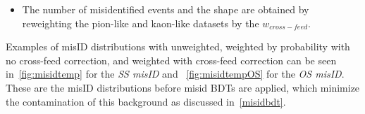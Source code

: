 \begin {itemize}
\begin{itemize}
\item For each event in both kaon-like and pion-like sample, $w_{cross-feed}$ = probability of being misidentified particle including the cross-contamination correction is 
	calculated 
\begin{equation}
w_{cross-feed}=\frac{n(p, \eta)^{final}_{\pi} \times M(p, \eta)_{\pi\rightarrow\mu}}{{N(p, \eta)}^{0}_{\pi}},
\end{equation}
\begin{equation}
w_{cross-feed}=\frac{n(p, \eta)^{final}_{K} \times M(p, \eta)_{K\rightarrow\mu}}{{N(p, \eta)}^{0}_{K}}.
\end{equation}
\end{itemize}

\item The number of misidentified events and the shape are obtained by reweighting the pion-like and kaon-like datasets by the $w_{cross-feed}$. 
	
\end{itemize}

Examples of misID distributions with unweighted, weighted by probability with no cross-feed correction, and weighted with cross-feed correction can be seen in~\autoref{fig:misidtemp} for the \textit{SS misID} and ~\autoref{fig:misidtempOS} for the \textit{OS misID}. These are the misID distributions before misid BDTs are applied, which minimize the contamination of this background as discussed in~\autoref{misidbdt}. 

